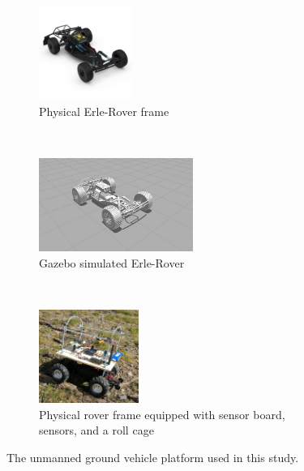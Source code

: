 \begin{figure}[!htb]
    \centering
    
    \begin{subfigure}[t]{0.33\textwidth}
        \centering
        \includegraphics[height=1.2in]{Figures/ErleRover.jpg}
        \caption{Physical Erle-Rover frame}
        \label{real_rover}
    \end{subfigure}%
    ~ 
    \begin{subfigure}[t]{0.33\textwidth}
        \centering
        \includegraphics[height=1.2in]{Figures/rover.jpg}
        \caption{Gazebo simulated Erle-Rover}
        \label{sim_rover}
    \end{subfigure}
    ~
     \begin{subfigure}[t]{0.33\textwidth}
        \centering
        \includegraphics[height=1.2in]{Figures/real_rover_cropped.jpg}
        \caption{Physical rover frame equipped with sensor board, sensors, and a roll cage}
        \vspace{-0.1in}
        \label{msu_rover}
    \end{subfigure}
    \caption{The unmanned ground vehicle platform used in this study.}
    \label{rover_pics}
    \vspace{-0.12in}
\end{figure}

